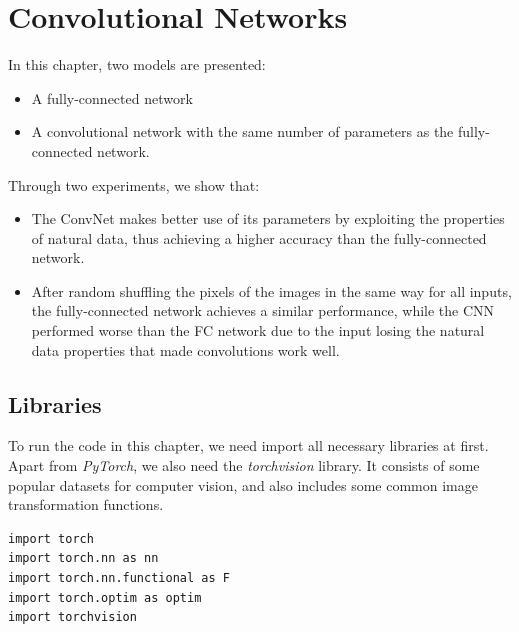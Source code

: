\chapter{Convolutional Networks}
    
    In this chapter, two models are presented:
    \begin{itemize}
        \item A fully-connected network 
        \item A convolutional network with the same number of parameters as the fully-connected network.
    \end{itemize}
    Through two experiments, we show that:
    \begin{itemize}
        \item The ConvNet makes better use of its parameters by exploiting the properties of natural data, thus achieving a higher accuracy than the fully-connected network.
        \item After random shuffling the pixels of the images in the same way for all inputs, the fully-connected network achieves a similar performance, while the CNN performed worse than the FC network due to the input losing the natural data properties that made convolutions work well.
    \end{itemize}

    \section{Libraries}
    To run the code in this chapter, we need import all necessary libraries at first.
    Apart from \emph{PyTorch}, we also need the \emph{torchvision} library.
    It consists of some popular datasets for computer vision, and also includes some common image transformation functions.
    \begin{verbatim}
import torch
import torch.nn as nn
import torch.nn.functional as F
import torch.optim as optim
import torchvision
    \end{verbatim}

